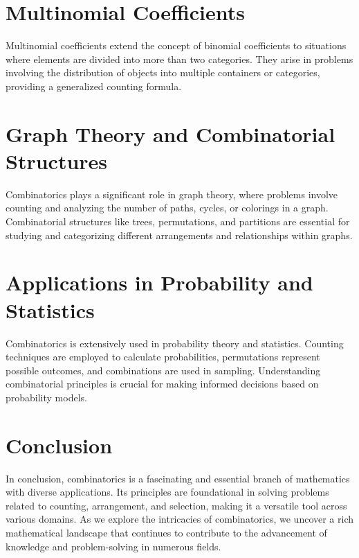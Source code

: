 \documentclass{article}
\begin{document}
\section*{Multinomial Coefficients}
Multinomial coefficients extend the concept of binomial coefficients to situations where elements are divided into more than two categories. They arise in problems involving the distribution of objects into multiple containers or categories, providing a generalized counting formula.

\section*{Graph Theory and Combinatorial Structures}
Combinatorics plays a significant role in graph theory, where problems involve counting and analyzing the number of paths, cycles, or colorings in a graph. Combinatorial structures like trees, permutations, and partitions are essential for studying and categorizing different arrangements and relationships within graphs.

\section*{Applications in Probability and Statistics}
Combinatorics is extensively used in probability theory and statistics. Counting techniques are employed to calculate probabilities, permutations represent possible outcomes, and combinations are used in sampling. Understanding combinatorial principles is crucial for making informed decisions based on probability models.

\section*{Conclusion}
In conclusion, combinatorics is a fascinating and essential branch of mathematics with diverse applications. Its principles are foundational in solving problems related to counting, arrangement, and selection, making it a versatile tool across various domains. As we explore the intricacies of combinatorics, we uncover a rich mathematical landscape that continues to contribute to the advancement of knowledge and problem-solving in numerous fields.
\end{document}

